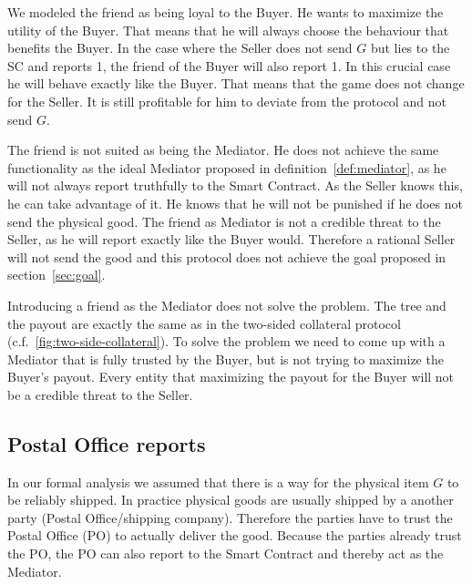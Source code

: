 \documentclass{cacthesis}
\begin{document}
We modeled the friend as being loyal to the Buyer. He wants to maximize the utility of the Buyer.
That means that he will always choose the behaviour that benefits the Buyer. In the case where the Seller does not send $G$ but lies to the SC and reports 1, the friend of the Buyer will also report 1. In this crucial case he will behave exactly like the Buyer. That means that the game does not change for the Seller. It is still profitable for him to deviate from the protocol and not send $G$.\newline

The friend is not suited as being the Mediator. He does not achieve the same functionality as the ideal Mediator proposed in definition~\ref{def:mediator}, as he will not always report truthfully to the Smart Contract. As the Seller knows this, he can take advantage of it. He knows that he will not be punished if he does not send the physical good. The friend as Mediator is not a credible threat to the Seller, as he will report exactly like the Buyer would. Therefore a rational Seller will not send the good and this protocol does not achieve the goal proposed in section~\ref{sec:goal}.\newline

Introducing a friend as the Mediator does not solve the problem. The tree and
the payout are exactly the same as in the two-sided collateral protocol (c.f.~\ref{fig:two-side-collateral}).
To solve the problem we need to come up with a Mediator that is fully trusted by
the Buyer, but is not trying to maximize the Buyer's payout.
Every entity that maximizing the payout for the Buyer will not be a
credible threat to the Seller.


\subsection{Postal Office reports}
In our formal analysis we assumed that there is a way for the physical item $G$ to be reliably shipped. In practice physical goods are usually shipped by a another party (Postal Office/shipping company).
Therefore the parties have to trust the Postal Office (PO) to actually deliver the good. Because the parties already trust the PO, the PO can also report to the Smart Contract and thereby act as the Mediator.\newline
\end{document}

